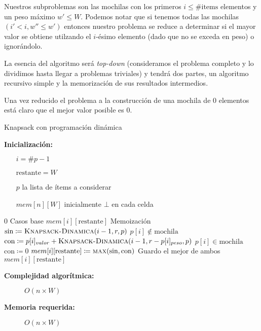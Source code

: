 \documentclass[fleqn, 11pt]{article}
\def\is{\coloneqq}
\begin{document}
Nuestros subproblemas son las mochilas con los primeros $i \le \#\text{items}$
elementos y un peso máximo $w' \le W$. Podemos notar que si tenemos todas las
mochilas $(i' < i, w'' \le w')$ entonces nuestro problema se reduce a
determinar si el mayor valor se obtiene utilzando el $i$-ésimo elemento (dado
que no se exceda en peso) o ignorándolo.

La esencia del algoritmo será \emph{top-down} (consideramos el problema
completo y lo dividimos hasta llegar a problemas triviales) y tendrá dos
partes, un algoritmo recursivo simple y la memorización de sus resultados
intermedios.

Una vez reducido el problema a la construcción de una mochila de $0$ elementos
está claro que el mejor valor posible es $0$.

\begin{algorithm}
\caption{Knapsack con programación dinámica}
\begin{algorithmic}[1]
\item[\textbf{Inicialización:}]
\item[] \begin{itemize}
	\item[] $i = \#p - 1$
	\item[] $\text{restante} = W$
	\item[] $p$ la lista de ítems a considerar
	\item[] $mem[n][W]$ inicialmente $\bot$ en cada celda
\end{itemize}
\Statex
{}
	\State \Return $0$
\Comment Casos base
\EndIf
{}
	\State	\Return $mem[i][\text{restante}]$
	\Comment Memoización
\EndIf
\State $\text{sin} \is \Call{Knapsack-Dinamica}{i - 1, r, p}$
\Comment $p[i] \not \in \text{mochila}$
	\State $\text{con} \is p[i]_{valor} + \Call{Knapsack-Dinamica}{i - 1, r - p[i]_{peso}, p}$
	\Comment $p[i] \in \text{mochila}$
\Else
	\State $\text{con} \is 0$
\EndIf
\State $mem[i][\text{restante}] \is \Call{max}{\text{sin}, \text{con}}$
\Comment Guardo el mejor de ambos
\State \Return $mem[i][\text{restante}]$
\EndFunction
\end{algorithmic}
\begin{description}
	\item[\textbf{Complejidad algorítmica:}] $O(n \times W)$
	\item[\textbf{Memoria requerida:}] $O(n \times W)$
\end{description}
\end{algorithm}
\end{document}
